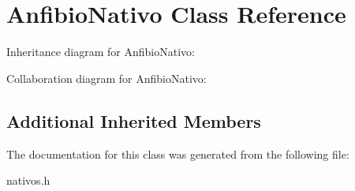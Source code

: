 \hypertarget{classAnfibioNativo}{}\section{Anfibio\+Nativo Class Reference}
\label{classAnfibioNativo}


Inheritance diagram for Anfibio\+Nativo\+:


Collaboration diagram for Anfibio\+Nativo\+:
\subsection*{Additional Inherited Members}


The documentation for this class was generated from the following file\+:\begin{DoxyCompactItemize}
\item 
nativos.\+h\end{DoxyCompactItemize}
